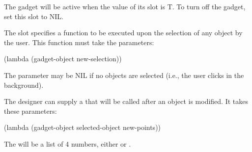 The  gadget will be active when the value of its
 slot is T.  To turn off the gadget, set this slot to NIL.

The  slot specifies a function to be executed
upon the selection of any object by the user.  This function must take
the parameters:
\begin{programexample}
(lambda (gadget-object new-selection))
\end{programexample}
The  parameter may be NIL if no
objects are selected (i.e., the user clicks in the background).

The designer can supply a  that will be called
after an object is modified.  It takes these parameters:
\begin{programexample}
(lambda (gadget-object selected-object new-points))
\end{programexample}
The  will be a list of 4 numbers,
either  or .


